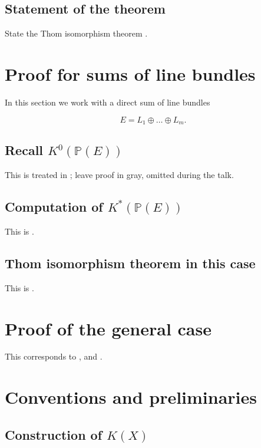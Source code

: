 \documentclass[12pt,a4paper]{amsart}
\theoremstyle{plain}
\theoremstyle{definition}
\theoremstyle{remark}
\begin{document}
\subsection{Statement of the theorem}

State the Thom isomorphism theorem \cite[Corollary 2.7.12]{ati67}.

\section{Proof for sums of line bundles}

In this section we work with a direct sum of line bundles

\[ E = L_{1} \oplus \ldots \oplus L_{m}. \]

\subsection{Recall $K^{0}(\mathbb{P}(E))$}

This is treated in \cite[Proposition 2.5.3]{ati67}; leave proof in gray, omitted during the talk.

\subsection{Computation of $K^{*}(\mathbb{P}(E))$}

This is \cite[Proposition 2.7.1]{ati67}.

\subsection{Thom isomorphism theorem in this case}

This is \cite[Proposition 2.7.2]{ati67}.

\section{Proof of the general case}

This corresponds to \cite[Proposition 2.7.8]{ati67}, \cite[Proposition 2.7.9]{ati67} and \cite[Proposition 2.7.12]{ati67}.

\appendix

\section{Conventions and preliminaries}

\subsection{Construction of $K(X)$}
\end{document}
